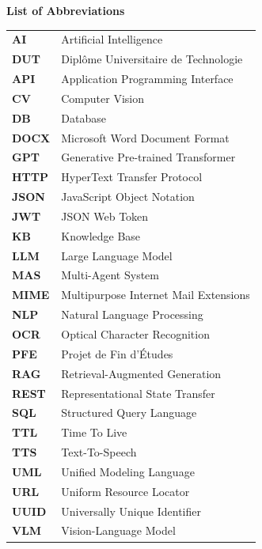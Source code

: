 \clearpage
{}
{}
{\noindent\huge\bfseries List of Abbreviations\par}
\vspace{1.5em}

\begin{tabular}{p{2.5cm} p{10cm}}
\textbf{AI}   & Artificial Intelligence \\[4pt]
\textbf{DUT}  & Diplôme Universitaire de Technologie \\[4pt]
\textbf{API}  & Application Programming Interface \\[4pt]
\textbf{CV}   & Computer Vision \\[4pt]
\textbf{DB}   & Database \\[4pt]
\textbf{DOCX} & Microsoft Word Document Format \\[4pt]
\textbf{GPT}  & Generative Pre-trained Transformer \\[4pt]
\textbf{HTTP} & HyperText Transfer Protocol \\[4pt]
\textbf{JSON} & JavaScript Object Notation \\[4pt]
\textbf{JWT}  & JSON Web Token \\[4pt]
\textbf{KB}   & Knowledge Base \\[4pt]
\textbf{LLM}  & Large Language Model \\[4pt]
\textbf{MAS}  & Multi-Agent System \\[4pt]
\textbf{MIME} & Multipurpose Internet Mail Extensions \\[4pt]
\textbf{NLP}  & Natural Language Processing \\[4pt]
\textbf{OCR}  & Optical Character Recognition \\[4pt]
\textbf{PFE}  & Projet de Fin d'Études \\[4pt]
\textbf{RAG}  & Retrieval-Augmented Generation \\[4pt]
\textbf{REST} & Representational State Transfer \\[4pt]
\textbf{SQL}  & Structured Query Language \\[4pt]
\textbf{TTL}  & Time To Live \\[4pt]
\textbf{TTS}  & Text-To-Speech \\[4pt]
\textbf{UML}  & Unified Modeling Language \\[4pt]
\textbf{URL}  & Uniform Resource Locator \\[4pt]
\textbf{UUID} & Universally Unique Identifier \\[4pt]
\textbf{VLM}  & Vision-Language Model \\[4pt]
\end{tabular}
